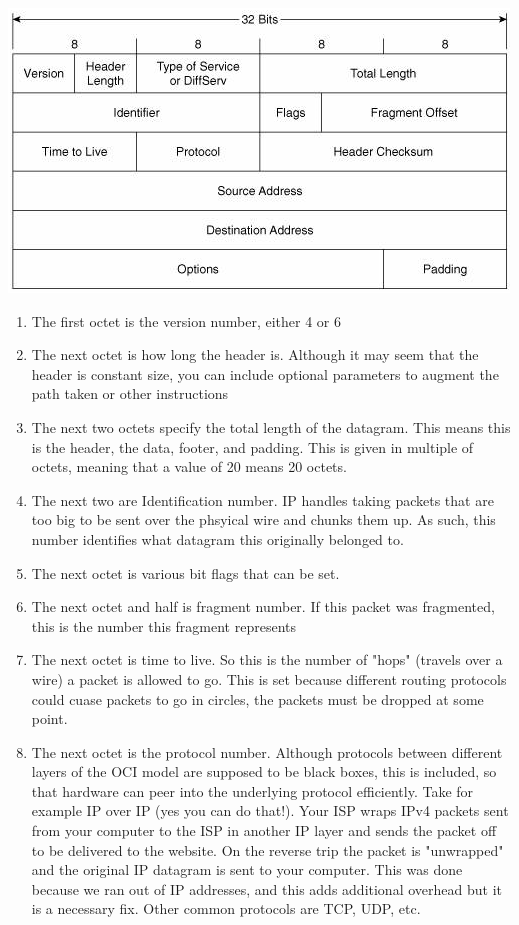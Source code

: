 \begin{center}
\includegraphics[width=.8\textwidth]{networking/images/ipv4_header.png}
\end{center}

\begin{enumerate}
  \item The first octet is the version number, either 4 or 6
  \item The next octet is how long the header is. Although it may seem that the header is constant size, you can include optional parameters to augment the path taken or other instructions
  \item The next two octets specify the total length of the datagram. This means this is the header, the data, footer, and padding. This is given in multiple of octets, meaning that a value of 20 means 20 octets.
  \item The next two are Identification number. IP handles taking packets that are too big to be sent over the phsyical wire and chunks them up. As such, this number identifies what datagram this originally belonged to.
  \item The next octet is various bit flags that can be set.
  \item The next octet and half is fragment number. If this packet was fragmented, this is the number this fragment represents
  \item The next octet is time to live. So this is the number of "hops" (travels over a wire) a packet is allowed to go. This is set because different routing protocols could cuase packets to go in circles, the packets must be dropped at some point.
  \item The next octet is the protocol number. Although protocols between different layers of the OCI model are supposed to be black boxes, this is included, so that hardware can peer into the underlying protocol efficiently. Take for example IP over IP (yes you can do that!). Your ISP wraps IPv4 packets sent from your computer to the ISP in another IP layer and sends the packet off to be delivered to the website. On the reverse trip the packet is "unwrapped" and the original IP datagram is sent to your computer. This was done because we ran out of IP addresses, and this adds additional overhead but it is a necessary fix. Other common protocols are TCP, UDP, etc.

\end{enumerate}
